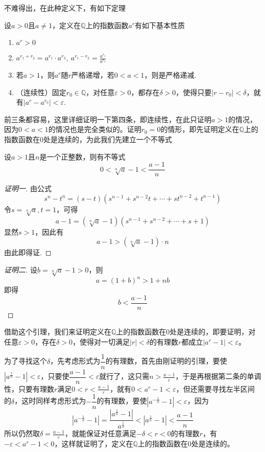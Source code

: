 不难得出，在此种定义下，有如下定理
\begin{theorem}
  设$a>0$且$a \neq 1$，定义在$\mathbb{Q}$上的指数函数$a^r$有如下基本性质
\begin{enumerate}
\item $a^r>0$
\item $a^{r_1+r_2}=a^{r_1}\cdot a^{r_2}, \ a^{r_1-r_2} = \frac{a^{r_1}}{a^{r_2}} $
\item 若$a>1$，则$a^r$随$r$严格递增，若$0<a<1$，则是严格递减.
\item （连续性）固定$r_0\in \mathbb{Q}$，对任意$\varepsilon>0$，都存在$\delta>0$，使得只要$|r-r_0|<\delta$，就有$|a^r-a^{r_0}|<\varepsilon$.
\end{enumerate}
\end{theorem}

前三条都容易，这里详细证明一下第四条，即连续性，在此只证明$a>1$的情况，因为$0<a<1$的情况也是完全类似的。证明$r_0=0$的情形，即先证明定义在$\mathbb{Q}$上的指数函数在$0$处是连续的，为此我们先建立一个不等式
\begin{lemma}
  设$a>1$且$n$是一个正整数，则有不等式
  \[ 0< \sqrt[n]{a}-1 < \frac{a-1}{n} \]
\end{lemma}

\begin{proof}[证明一]
  由公式
  \[ s^n-t^n=(s-t)(s^{n-1}+s^{n-2}t+\cdots+st^{n-2}+t^{n-1}) \]
  令$s=\sqrt[n]{a},t=1$，可得
  \[ a-1=(\sqrt[n]{a}-1)(s^{n-1}+s^{n-2}+\cdots+s+1) \]
  显然$s>1$，因此有
  \[ a-1> (\sqrt[n]{a}-1) \cdot n\]
  由此即得证.
\end{proof}

\begin{proof}[证明二]
  设$b=\sqrt[n]{a}-1>0$，则
  \[ a = (1+b)^n > 1 + nb \]
  即得
  \[ b < \frac{a-1}{n} \]
\end{proof}

借助这个引理，我们来证明定义在$\mathbb{Q}$上的指数函数在0处是连续的，即要证明，对任意$\varepsilon>0$，存在$\delta>0$，使得对一切满足$|r|<\delta$的有理数$r$都成立$|a^r-1|<\varepsilon$。

为了寻找这个$\delta$，先考虑形式为$\dfrac{1}{n}$的有理数，首先由刚证明的引理，要使$|a^{\frac{1}{n}}-1|<\varepsilon$，只要使$\dfrac{a-1}{n}<\varepsilon$就行了，这只需$n>\frac{a-1}{\varepsilon}$，于是再根据第二条的单调性，只要有理数$r$满足$0<r<\frac{a-1}{\varepsilon}$，就有$0<a^r-1<\varepsilon$，但还需要寻找左半区间的$\delta$，这时同样考虑形式为$-\dfrac{1}{n}$的有理数，要使$|a^{-\frac{1}{n}}-1|<\varepsilon$，因为
\[ |a^{-\frac{1}{n}}-1|=\frac{|a^{\frac{1}{n}}-1|}{a^{\frac{1}{n}}} < |a^{\frac{1}{n}}-1| < \frac{a-1}{n} \]
所以仍然取$\delta=\frac{a-1}{\varepsilon}$，就能保证对任意满足$-\delta<r<0$的有理数$r$，有$-\varepsilon<a^r-1<0$，这样就证明了，定义在$\mathbb{Q}$上的指数函数在$0$处是连续的。

